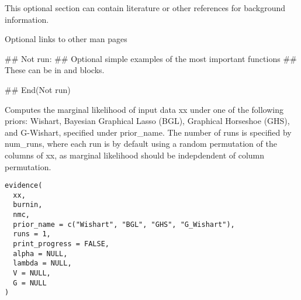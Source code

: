 \documentclass[a4paper]{book}
\begin{document}
%
\begin{References}\relax
This optional section can contain literature or other references for
background information.
\end{References}
%
\begin{SeeAlso}\relax
Optional links to other man pages
\end{SeeAlso}
%
\begin{Examples}
\begin{ExampleCode}
  ## Not run: 
     ## Optional simple examples of the most important functions
     ## These can be in \dontrun{} and \donttest{} blocks.   
  
## End(Not run)
\end{ExampleCode}
\end{Examples}
%
\begin{Description}\relax
Computes the marginal likelihood of input data xx under one of the following
priors: Wishart, Bayesian Graphical Lasso (BGL), 
Graphical Horseshoe (GHS), and G-Wishart, specified under prior\_name. 
The number of runs is specified by num\_runs, where each run is by default
using a random permutation of the columns of xx, as marginal likelihood 
should be indepdendent of column permutation.
\end{Description}
%
\begin{Usage}
\begin{verbatim}
evidence(
  xx,
  burnin,
  nmc,
  prior_name = c("Wishart", "BGL", "GHS", "G_Wishart"),
  runs = 1,
  print_progress = FALSE,
  alpha = NULL,
  lambda = NULL,
  V = NULL,
  G = NULL
)
\end{verbatim}
\end{Usage}
%
\end{document}
